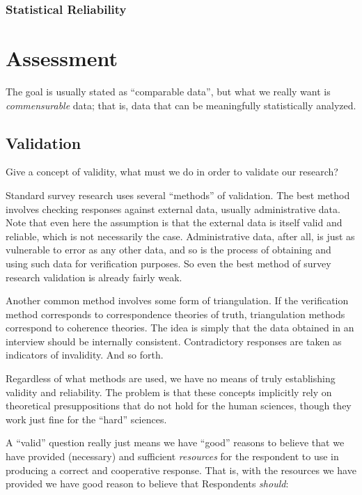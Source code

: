 \documentclass[11pt,twoside]{article}
\newcommand{\sr}{survey research}
\newcommand{\R}{Respondent}
\begin{document}
\subsubsection{Statistical Reliability}

\section{Assessment}

The goal is usually stated as \enquote{comparable data}, but what we
really want is \textit{commensurable} data; that is, data that can be
meaningfully statistically analyzed.

\subsection{Validation}

Give a concept of validity, what must we do in order to validate our research?

Standard \sr{} uses several \enquote{methods} of validation.  The best
method involves checking responses against external data, usually
administrative data.  Note that even here the assumption is that the
external data is itself valid and reliable, which is not necessarily
the case.  Administrative data, after all, is just as vulnerable to
error as any other data, and so is the process of obtaining and using
such data for verification purposes.  So even the best method of \sr{}
validation is already fairly weak.

Another common method involves some form of triangulation.  If the
verification method corresponds to correspondence theories of truth,
triangulation methods correspond to coherence theories.  The idea is
simply that the data obtained in an interview should be internally
consistent.  Contradictory responses are taken as indicators of
invalidity.  And so forth.

Regardless of what methods are used, we have no means of truly
establishing validity and reliability.  The problem is that these
concepts implicitly rely on theoretical presuppositions that do not
hold for the human sciences, though they work just fine for the
\enquote{hard} sciences.

A \enquote{valid} question really just means we have \enquote{good} reasons to
believe that we have provided (necessary) and sufficient
\textit{resources} for the respondent to use in producing a correct
and cooperative response.  That is, with the resources we have
provided we have good reason to believe that \R{}s \textit{should}:
\end{document}
